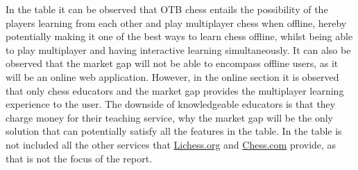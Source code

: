 In the table it can be observed that OTB chess entails the possibility of the players learning from each other and play
multiplayer chess when offline, hereby potentially making it one of the best ways to learn chess offline, whilst being
able to play multiplayer and having interactive learning simultaneously.
It can also be observed that the market gap will not be able to encompass offline users, as it will be an online web
application.
However, in the online section it is observed that only chess educators and the market gap provides the multiplayer
learning experience to the user.
The downside of knowledgeable educators is that they charge money for their teaching service, why the market gap will be
the only solution that can potentially satisfy all the features in the table.
In the table is not included all the other services that \url{Lichess.org} and \url{Chess.com} provide, as that is not
the focus of the report.

